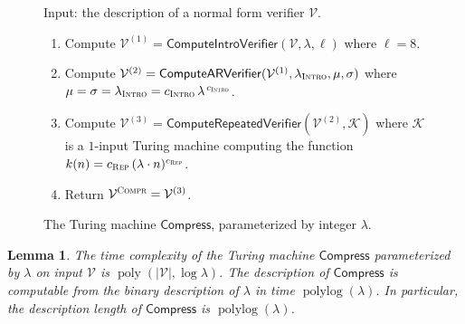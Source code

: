\documentclass[11pt]{article}
\newtheorem{lemma}[theorem]{Lemma}
\theoremstyle{definition}
\DeclareMathOperator{\poly}{poly}
\DeclareMathOperator{\polylog}{polylog}
\newcommand{\abs}[1]{\left\vert {#1} \right\vert}
\newcommand{\verifier}{\mathcal{V}}
\newcommand{\gamestyle}[1]{\ensuremath{\textsc{#1}}\xspace}
\newcommand{\ar}{\gamestyle{AR}}
\newcommand{\intro}{\gamestyle{Intro}}
\newcommand{\compr}{\textsc{Compr}}
\renewcommand{\cal}[1]{\mathcal{#1}}
\newcommand{\tmstyle}[1]{\ensuremath{\mathsf{#1}}}
\newcommand{\Compress}{\tmstyle{Compress}}
\newcommand{\ComputeIntroVerifier}{\tmstyle{ComputeIntroVerifier}}
\newcommand{\ComputeAnsVerifier}{\tmstyle{ComputeARVerifier}}
\newcommand{\ComputeParrepVerifier}{\tmstyle{ComputeRepeatedVerifier}}
\newenvironment{gamespec}{
  \begin{mdframed}[style=figstyle]}{
  \end{mdframed}}
\newcommand{\rep}{\gamestyle{Rep}}
\begin{document}
\begin{figure}[H]
  \centering
  \begin{gamespec}
  	Input: the description of a normal form verifier $\verifier$.
    \begin{enumerate}
		\item \label{enu:compress-intro} Compute $\verifier^{(1)} =
      \ComputeIntroVerifier(\verifier, \lambda, \ell)$ where $\ell = 8$.

		\item \label{enu:compress-ans} Compute $\verifier^{(2)} =
      \ComputeAnsVerifier(\verifier^{(1)}, \lambda_\intro, \mu,\sigma)$ where
      $\mu = \sigma = \lambda_\intro = c_\intro\, \lambda^{\, c_\intro}$.

		\item \label{enu:compress-rep2} Compute $\verifier^{(3)} =
      \ComputeParrepVerifier(\verifier^{(2)}, \cal{K})$ where $\cal{K}$ is a
      $1$-input Turing machine computing the function $k(n) = c_\rep\, ( \lambda
      \cdot n)^{c_\rep}$.

		\item Return $\verifier^\compr = \verifier^{(3)}$.
	\end{enumerate}
  \end{gamespec}
  \caption{The Turing machine $\Compress$, parameterized by integer $\lambda$.}
  \label{fig:compress}
\end{figure}

\begin{lemma}
  \label{lem:compress-complexity}
  The time complexity of the Turing machine $\Compress$ parameterized by
  $\lambda$ on input $\verifier$ is $\poly(\abs{\verifier}, \log \lambda)$.
  The description of $\Compress$ is computable from the binary description of
  $\lambda$ in time $\polylog(\lambda)$.
  In particular, the description length of $\Compress$ is $\polylog (\lambda)$.
\end{lemma}
\end{document}
